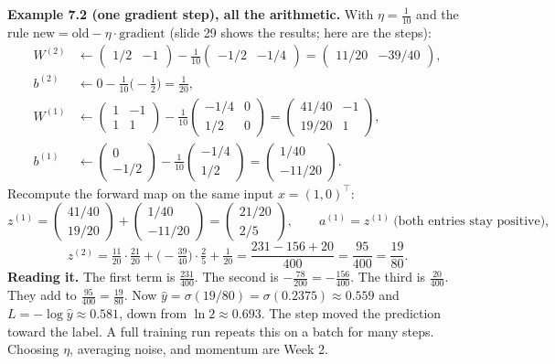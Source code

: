 \textbf{Example 7.2 (one gradient step), all the arithmetic.} With $\eta=\tfrac1{10}$ and the rule $\text{new}=\text{old}-\eta\cdot\text{gradient}$ (slide 29 shows the results; here are the steps):
\[
\begin{aligned}
W^{(2)}&\leftarrow\begin{pmatrix}1/2&-1\end{pmatrix}-\tfrac1{10}\begin{pmatrix}-1/2&-1/4\end{pmatrix}=\begin{pmatrix}11/20&-39/40\end{pmatrix},\\
b^{(2)}&\leftarrow0-\tfrac1{10}\Big(-\tfrac12\Big)=\tfrac1{20},\\
W^{(1)}&\leftarrow\begin{pmatrix}1&-1\\1&1\end{pmatrix}-\tfrac1{10}\begin{pmatrix}-1/4&0\\1/2&0\end{pmatrix}=\begin{pmatrix}41/40&-1\\19/20&1\end{pmatrix},\\
b^{(1)}&\leftarrow\begin{pmatrix}0\\-1/2\end{pmatrix}-\tfrac1{10}\begin{pmatrix}-1/4\\1/2\end{pmatrix}=\begin{pmatrix}1/40\\-11/20\end{pmatrix}.
\end{aligned}
\]
Recompute the forward map on the same input $x=(1,0)^\top$:
\[
z^{(1)}=\begin{pmatrix}41/40\\19/20\end{pmatrix}+\begin{pmatrix}1/40\\-11/20\end{pmatrix}=\begin{pmatrix}21/20\\2/5\end{pmatrix}, \qquad a^{(1)}=z^{(1)}\ \text{(both entries stay positive)},
\]
\[
z^{(2)}=\tfrac{11}{20}\cdot\tfrac{21}{20}+\Big(-\tfrac{39}{40}\Big)\cdot\tfrac25+\tfrac1{20}=\frac{231-156+20}{400}=\frac{95}{400}=\frac{19}{80}.
\]
\textbf{Reading it.} The first term is $\tfrac{231}{400}$. The second is $-\tfrac{78}{200}=-\tfrac{156}{400}$. The third is $\tfrac{20}{400}$. They add to $\tfrac{95}{400}=\tfrac{19}{80}$. Now $\hat{y}=\sigma(19/80)=\sigma(0.2375)\approx0.559$ and $L=-\log\hat{y}\approx0.581$, down from $\ln2\approx0.693$. The step moved the prediction toward the label. A full training run repeats this on a batch for many steps. Choosing $\eta$, averaging noise, and momentum are Week 2.

